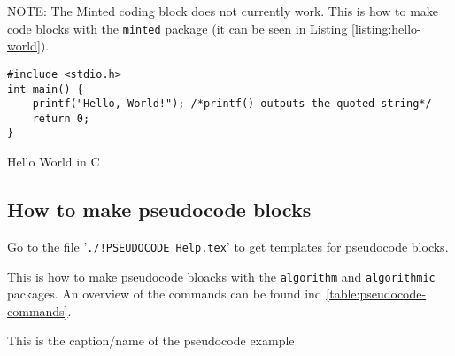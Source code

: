 \FloatBarrier
NOTE: The Minted coding block does not currently work.
This is how to make code blocks with the \texttt{minted} package (it can be seen
in Listing \ref{listing:hello-world}).

\begin{listing}[h]
\begin{verbatim}
#include <stdio.h>
int main() {
    printf("Hello, World!"); /*printf() outputs the quoted string*/
    return 0;
}
\end{verbatim}
\caption{Hello World in C}
\label{listing:hello-world}
\end{listing}

\subsection{How to make pseudocode blocks}

Go to the file '\texttt{./!PSEUDOCODE Help.tex}' to get templates for pseudocode blocks.

This is how to make pseudocode bloacks with the \texttt{algorithm} and
\texttt{algorithmic} packages. An overview of the commands can be found ind
\autoref{table:pseudocode-commands}.

\begin{algorithm}
    \caption{This is the caption/name of the pseudocode example}
    \label{alg:pseudocode}
    \begin{algorithmic}[1]
        \EndFor
            \EndFor
        \EndFunction
    \end{algorithmic}
\end{algorithm}


